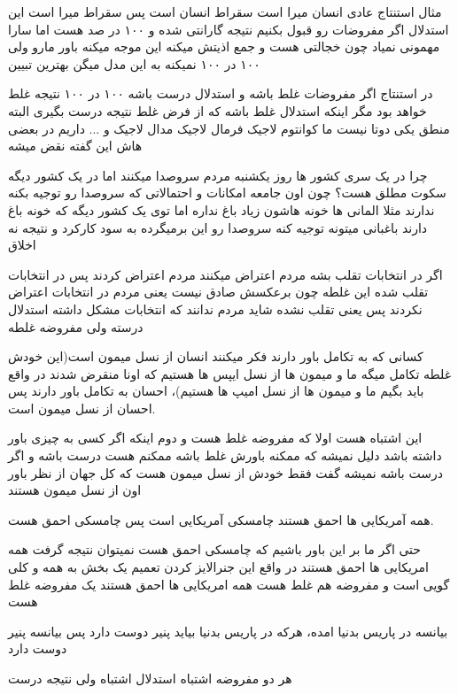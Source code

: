 \documentclass{article}
\begin{document}
	
		  مثال استنتاج عادی انسان میرا است سقراط انسان است پس سقراط میرا است این استدلال
		اگر مفروضات رو قبول بکنیم نتیجه گارانتی شده و ۱۰۰ در صد هست اما سارا مهمونی نمیاد چون خجالتی هست و جمع اذیتش میکنه این موجه میکنه
		باور مارو ولی ۱۰۰ در ۱۰۰ نمیکنه به این مدل میگن بهترین تبیین
		
		 در استنتاج اگر مفروضات غلط باشه و استدلال درست باشه ۱۰۰ در ۱۰۰ نتیجه 
		غلط خواهد بود مگر اینکه استدلال غلط باشه که از فرض غلط نتیجه درست بگیری البته منطق یکی دوتا نیست ما کوانتوم لاجیک فرمال لاجیک 
		مدال لاجیک و ... داریم در بعضی هاش این گفته نقض میشه 
		
		  چرا در یک سری کشور ها روز یکشنبه مردم سروصدا میکنند اما در یک کشور دیگه سکوت مطلق هست؟ چون
		اون جامعه امکانات و احتمالاتی که سروصدا رو توجیه بکنه ندارند مثلا المانی ها خونه هاشون زیاد باغ نداره اما توی یک کشور دیگه که خونه
		باغ دارند باغبانی میتونه توجیه کنه سروصدا رو این برمیگرده به سود کارکرد و نتیجه نه اخلاق
		
		 اگر در انتخابات تقلب بشه مردم اعتراض میکنند مردم اعتراض کردند پس در انتخابات تقلب شده این غلطه چون برعکسش صادق 
		نیست یعنی مردم در انتخابات اعتراض نکردند پس یعنی تقلب نشده شاید مردم ندانند که انتخابات مشکل داشته استدلال درسته ولی مفروضه غلطه
		
		 کسانی که به تکامل باور دارند فکر میکنند انسان از نسل میمون است(این خودش غلطه تکامل میگه ما و میمون ها از نسل 
		ایپس ها هستیم که اونا منقرض شدند در واقع باید بگیم ما و میمون ها از نسل امیپ ها هستیم)، احسان به تکامل باور دارند پس احسان از 
		نسل میمون است.
		
		این اشتباه هست اولا که مفروضه غلط هست و دوم اینکه اگر کسی به چیزی باور داشته باشد دلیل نمیشه که ممکنه باورش غلط باشه ممکنم هست 
		درست باشه و اگر درست باشه نمیشه گفت فقط خودش از نسل میمون هست که کل جهان از نظر باور اون از نسل میمون هستند
		
		
		 همه آمریکایی ها احمق هستند چامسکی آمریکایی است پس چامسکی احمق هست.
		
		حتی اگر ما بر این باور باشیم که چامسکی احمق هست نمیتوان نتیجه گرفت همه امریکایی ها احمق هستند در واقع این جنرالایز کردن تعمیم یک
		بخش به همه و کلی گویی است و مفروضه هم غلط هست همه امریکایی ها احمق هستند یک مفروضه غلط هست
		
		 بیانسه در پاریس بدنیا امده، هرکه در پاریس بدنیا بیاید پنیر دوست دارد  پس بیانسه پنیر دوست دارد 
		
		هر دو مفروضه اشتباه استدلال اشتباه ولی نتیجه درست
		
\end{document}
